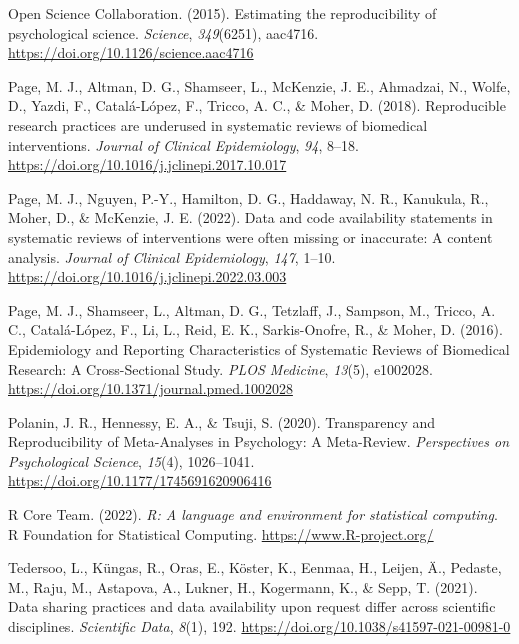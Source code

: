 \documentclass[
  ,apa7,floatsintext]{apa6}
\newlength{\cslhangindent}
\newlength{\cslentryspacingunit} %
\newenvironment{CSLReferences}[2] %
 {%
  \setlength{\parindent}{0pt}
  \ifodd #1
  \let\oldpar\par
  \def\par{\hangindent=\cslhangindent\oldpar}
  \fi
  \setlength{\parskip}{#2\cslentryspacingunit}
 }%
 {}
\begin{document}
\begin{CSLReferences}{1}{0}
\leavevmode{}%
Open Science Collaboration. (2015). Estimating the reproducibility of psychological science. \emph{Science}, \emph{349}(6251), aac4716. \url{https://doi.org/10.1126/science.aac4716}

\leavevmode{}%
Page, M. J., Altman, D. G., Shamseer, L., McKenzie, J. E., Ahmadzai, N., Wolfe, D., Yazdi, F., Catalá-López, F., Tricco, A. C., \& Moher, D. (2018). Reproducible research practices are underused in systematic reviews of biomedical interventions. \emph{Journal of Clinical Epidemiology}, \emph{94}, 8--18. \url{https://doi.org/10.1016/j.jclinepi.2017.10.017}

\leavevmode{}%
Page, M. J., Nguyen, P.-Y., Hamilton, D. G., Haddaway, N. R., Kanukula, R., Moher, D., \& McKenzie, J. E. (2022). Data and code availability statements in systematic reviews of interventions were often missing or inaccurate: A content analysis. \emph{Journal of Clinical Epidemiology}, \emph{147}, 1--10. \url{https://doi.org/10.1016/j.jclinepi.2022.03.003}

\leavevmode{}%
Page, M. J., Shamseer, L., Altman, D. G., Tetzlaff, J., Sampson, M., Tricco, A. C., Catalá-López, F., Li, L., Reid, E. K., Sarkis-Onofre, R., \& Moher, D. (2016). Epidemiology and {Reporting} {Characteristics} of {Systematic} {Reviews} of {Biomedical} {Research}: {A} {Cross}-{Sectional} {Study}. \emph{PLOS Medicine}, \emph{13}(5), e1002028. \url{https://doi.org/10.1371/journal.pmed.1002028}

\leavevmode{}%
Polanin, J. R., Hennessy, E. A., \& Tsuji, S. (2020). Transparency and {Reproducibility} of {Meta-Analyses} in {Psychology}: {A Meta-Review}. \emph{Perspectives on Psychological Science}, \emph{15}(4), 1026--1041. \url{https://doi.org/10.1177/1745691620906416}

\leavevmode{}%
R Core Team. (2022). \emph{R: A language and environment for statistical computing}. R Foundation for Statistical Computing. \url{https://www.R-project.org/}

\leavevmode{}%
Tedersoo, L., Küngas, R., Oras, E., Köster, K., Eenmaa, H., Leijen, Ä., Pedaste, M., Raju, M., Astapova, A., Lukner, H., Kogermann, K., \& Sepp, T. (2021). Data sharing practices and data availability upon request differ across scientific disciplines. \emph{Scientific Data}, \emph{8}(1), 192. \url{https://doi.org/10.1038/s41597-021-00981-0}


\end{CSLReferences}
\end{document}
